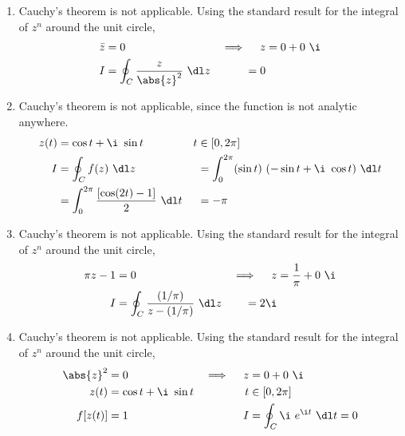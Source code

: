 \begin{enumerate}
    \item Cauchy's theorem \textcolor{y_p}{is not applicable}. Using the standard result
          for the integral of $ z^n $ around the unit circle,
          \begin{align}
              \bar{z}          & = 0                                     &
              \implies \quad z & = 0 + 0\ \i                               \\
              I                & = \oint_{C} \frac{z}{\abs{z}^2} \ \dl z
                               & = 0
          \end{align}

    \item Cauchy's theorem \textcolor{y_p}{is not applicable}, since the function is not
          analytic anywhere.
          \begin{align}
              z(t) & = \cos t + \i\ \sin t                                     &
              t    & \in [0, 2\pi]                                               \\
              I    & = \oint_{C} f(z) \ \dl z                                  &
                   & = \int_{0}^{2\pi} (\sin t)\ (-\sin t + \i\ \cos t)\ \dl t   \\
                   & = \int_{0}^{2\pi} \frac{[\cos(2t) - 1]}{2}\ \dl t         &
                   & = -\pi
          \end{align}

    \item Cauchy's theorem \textcolor{y_p}{is not applicable}. Using the standard result
          for the integral of $ z^n $ around the unit circle,
          \begin{align}
              \pi z - 1        & = 0                                             &
              \implies \quad z & = \frac{1}{\pi} + 0\ \i                           \\
              I                & = \oint_{C} \frac{(1/\pi)}{z - (1/\pi)} \ \dl z
                               & = 2\i
          \end{align}

    \item Cauchy's theorem \textcolor{y_p}{is not applicable}. Using the standard result
          for the integral of $ z^n $ around the unit circle,
          \begin{align}
              \abs{z}^2        & = 0                             &
              \implies \quad z & = 0 + 0\ \i                       \\
              z(t)             & = \cos t + \i\ \sin t           &
              t                & \in [0, 2\pi]                     \\
              f[z(t)]          & = 1                             &
              I                & = \oint_{C} \i\ e^{\i t}\ \dl t
              = 0
          \end{align}


\end{enumerate}
